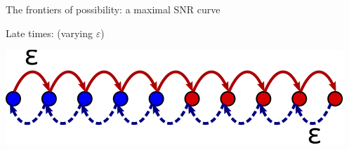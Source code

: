 \documentclass[final,hyperref={pdfpagelabels=false,bookmarks=false}]{beamer}
\DeclareMathOperator{\SNR}{SNR}
\begin{document}
\begin{frame}{}
\begin{columns}[t]
\begin{column}{0.3\linewidth}
\begin{block}{The frontiers of possibility: a maximal SNR curve}
{   %
   \vp Late times: (varying $\varepsilon$)
   \begin{center}
     \includegraphics[width=0.7\linewidth]{multistate_sticky.svg}
   \end{center}
}
%
\end{block}
%
%

\end{column}
\end{columns}
\end{frame}
\end{document}
